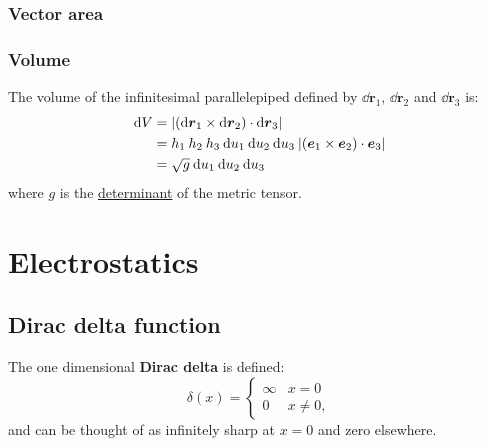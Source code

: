 \documentclass{article}
\begin{document}
\newpage

\subsubsection{Vector area}

\subsubsection{Volume}
The volume of the infinitesimal parallelepiped defined by
$\dd\boldsymbol{r}_1$, $\dd\boldsymbol{r}_2$ and $\dd\boldsymbol{r}_3$ is:
\begin{align*}
    \dd V
    &=|(\dd\boldsymbol{r}_1\times\dd\boldsymbol{r}_2)
    \cdot\dd\boldsymbol{r}_3| \\
    &=h_1\hspace{0.03in}h_2\hspace{0.03in}h_3\hspace{0.03in}
    \dd u_1\hspace{0.03in}\dd u_2\hspace{0.03in}\dd u_3\hspace{0.03in}
    |(\boldsymbol{e}_1\times\boldsymbol{e}_2)
    \cdot\boldsymbol{e}_3| \\
    &=\sqrt{g}\hspace{0.03in}
    \dd u_1\hspace{0.03in}\dd u_2\hspace{0.03in}\dd u_3\hspace{0.03in}
\end{align*}
where $g$ is the \underline{determinant} of the metric tensor.
\newpage

\section{Electrostatics}

\subsection{Dirac delta function}
The one dimensional \textbf{Dirac delta} is defined:
$$\delta(x) =
    \left\{
	\begin{array}{ll}
		\infty  & \mbox{} x=0 \\
		0 & \mbox{} x\neq0,
	\end{array}
    \right.$$
and can be thought of as infinitely sharp at $x=0$ and zero elsewhere. 
\end{document}
